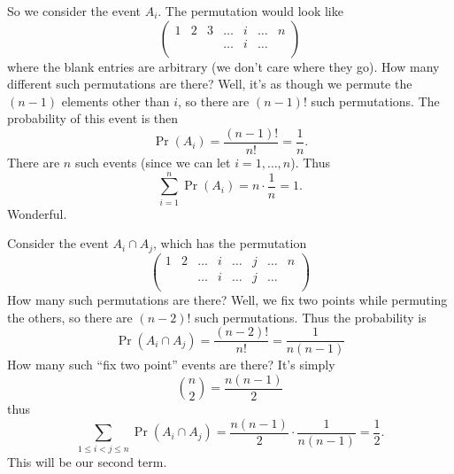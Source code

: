 \M So we consider the event $A_{i}$. The permutation would look like
\begin{equation}
\begin{pmatrix}
1 & 2 & 3 & \dots & i & \dots & n\\
  &   &   & \dots & i & \dots &  \\
\end{pmatrix}
\end{equation}
where the blank entries are arbitrary (we don't care where they go). How
many different such permutations are there? Well, it's as though we
permute the $(n-1)$ elements other than $i$, so there are $(n-1)!$ such
permutations. The probability of this event is then
\begin{equation}
\Pr(A_{i}) = \frac{(n-1)!}{n!} = \frac{1}{n}.
\end{equation}
There are $n$ such events (since we can let $i=1,\dots,n$). Thus
\begin{equation}
\sum^{n}_{i=1}\Pr(A_{i}) = n\cdot\frac{1}{n}=1.
\end{equation}
Wonderful.

\M Consider the event $A_i\cap A_j$, which has the permutation
\begin{equation}
\begin{pmatrix}
1 & 2 & \dots & i & \dots & j & \dots & n\\
  &   & \dots & i & \dots & j & \dots &  \\
\end{pmatrix}
\end{equation}
How many such permutations are there? Well, we fix two points while
permuting the others, so there are $(n-2)!$ such permutations. Thus the
probability is
\begin{equation}
\Pr(A_{i}\cap A_{j}) = \frac{(n-2)!}{n!}=\frac{1}{n(n-1)}
\end{equation}
How many such ``fix two point'' events are there? It's simply
\begin{equation}
\binom{n}{2}=\frac{n(n-1)}{2}
\end{equation}
thus
\begin{equation}
\sum_{1\leq i<j\leq n} \Pr(A_{i}\cap A_{j})
= \frac{n(n-1)}{2}\cdot\frac{1}{n(n-1)}=\frac{1}{2}.
\end{equation}
This will be our second term.

